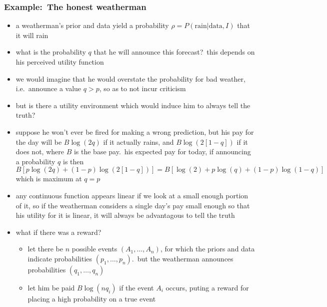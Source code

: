 \documentclass[../jaynes_prob_theory_notes.tex]{subfiles}
\begin{document}
            \subsubsection{Example:\ The honest weatherman}
                \begin{itemize} 
                    \item a weatherman's prior and data yield a probability \(\rho = P(\text{rain}|\text{data}, I)\) that it will rain
                    \item what is the probability \(q\) that he will announce this forecast?\ this depends on his perceived utility function
                    \item we would imagine that he would overstate the probability for bad weather, i.e.\ announce a value \(q > p\), so as to not incur criticism
                    \item but is there a utility environment which would induce him to always tell the truth?
                    \item suppose he won't ever be fired for making a wrong prediction, but his pay for the day will be \(B\log(2q)\) if it actually rains, and \(B\log(2[1-q])\) if it does not, where \(B\) is the base pay.\ his expected pay for today, if announcing a probability \(q\) is then
                        \begin{equation*} 
                            B[p\log(2q) + (1-p)\log(2[1-q])] = B[\log(2) + p\log(q) + (1-p)\log(1-q)]
                        \end{equation*}
                        which is maximum at \(q = p\)
                    \item any continuous function appears linear if we look at a small enough portion of it, so if the weatherman considers a single day's pay small enough so that his utility for it is linear, it will always be advantagous to tell the truth
                    \item what if there was a reward?
                        \begin{itemize} 
                            \item let there be \(n\) possible events \((A_1, \ldots, A_n)\), for which the priors and data indicate probabilities \((p_1, \ldots, p_n)\).\ but the weatherman announces probabilities \((q_1, \ldots, q_n)\)
                            \item let him be paid \(B\log(nq_i)\) if the event \(A_i\) occurs, puting a reward for placing a high probability on a true event

\end{itemize}
\end{itemize}
\end{document}
